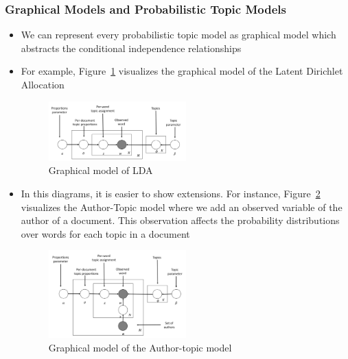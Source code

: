 \subsubsection{Graphical Models and Probabilistic Topic Models}
\begin{itemize}
	\item We can represent every probabilistic topic model as graphical model which abstracts the conditional independence relationships
	\item For example, Figure~\ref{img:semantic_matching_graphical_models_LDA} visualizes the graphical model of the Latent Dirichlet Allocation
	\begin{figure}[ht]
		\centering
		\includegraphics[width=0.5\textwidth]{figures/semantic_matching_graphical_models_LDA.png}
		\caption{Graphical model of LDA}
		\label{img:semantic_matching_graphical_models_LDA}
	\end{figure}
	\item In this diagrams, it is easier to show extensions. For instance, Figure~\ref{img:semantic_matching_graphical_models_author_model} visualizes the Author-Topic model where we add an observed variable of the author of a document. This observation affects the probability distributions over words for each topic in a document 
	\begin{figure}[ht]
		\centering
		\includegraphics[width=0.5\textwidth]{figures/semantic_matching_graphical_models_author_model.png}
		\caption{Graphical model of the Author-topic model}
		\label{img:semantic_matching_graphical_models_author_model}
	\end{figure}
\end{itemize}
